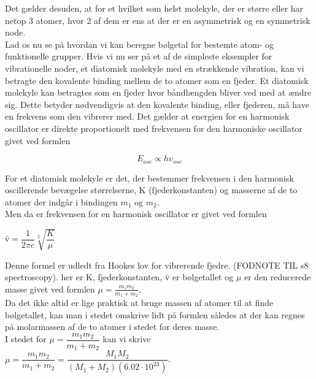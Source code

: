 Det gælder desuden, at for et hvilket som helst molekyle, der er større eller har netop 3 atomer, hvor 2 af dem er ens at der er en asymmetrisk og en symmetrisk node. 
\\

Lad os nu se på hvordan vi kan beregne bølgetal for bestemte atom- og funktionelle grupper. Hvis vi nu ser på et af de simpleste eksempler for vibrationelle noder, et diatomisk molekyle med en strækkende vibration, kan vi betragte den kovalente binding mellem de to atomer som en fjeder. Et diatomisk molekyle kan betragtes som en fjeder hvor båndlængden bliver ved med at ændre sig. Dette betyder nødvendigvis at den kovalente binding, eller fjederen, må have en frekvens som den vibrerer med. Det gælder at energien for en harmonisk oscillator er direkte proportionelt med frekvensen for den harmoniske oscillator givet ved formlen

\begin{center}
\begin{equation}
E_{osc} \propto h \upsilon_{osc}
\end{equation}
\end{center}

For et diatomisk molekyle er det, der bestemmer frekvensen i den harmonisk oscillerende bevægelse størrelserne, K (fjederkonstanten) og masserne af de to atomer der indgår i bindingen $m_1$ og $m_2$.
\\
Men da er frekvensen for en harmonisk oscillator er givet ved formlen

\begin{center}
\={v}$= \dfrac{1}{2 \pi c} \sqrt[2]{\dfrac{K}{\mu}}$
\end{center}

Denne formel er udledt fra Hookes lov for vibrerende fjedre. (FODNOTE TIL s8 spectroscopy). her er K, fjederkonstanten, \={v} er bølgetallet og $\mu$ er den reducerede masse givet ved formlen $\mu = \frac{m_1 m_2}{m_1 + m_2}$. 
\\

Da det ikke altid er lige praktisk at bruge massen af atomer til at finde bølgetallet, kan man i stedet omskrive lidt på formlen således at der kan regnes på molarmassen af de to atomer i stedet for deres masse.
\\

I stedet for $\mu = \dfrac{m_1 m_2}{m_1 + m_2}$ kan vi skrive $\mu = \dfrac{m_1 m_2}{m_1 + m_2} = \dfrac{M_1 M_2}{(M_1 + M_2 ) (6.02 \cdot 10^{23})}$. 
\\

